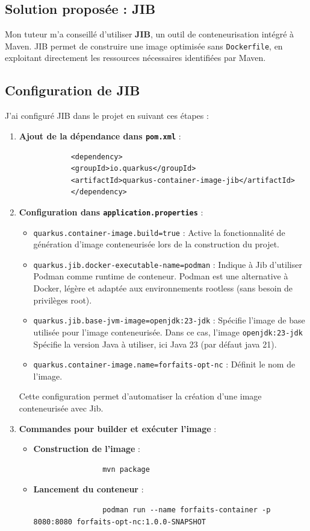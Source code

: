 \documentclass{article}
\begin{document}
	\subsection*{Solution proposée : JIB}
	
	Mon tuteur m'a conseillé d'utiliser \textbf{JIB}, un outil de conteneurisation intégré à Maven. JIB permet de construire une image optimisée sans \texttt{Dockerfile}, en exploitant directement les ressources nécessaires identifiées par Maven.
	
	\subsection{Configuration de JIB}
	
	J'ai configuré JIB dans le projet en suivant ces étapes :
	\begin{enumerate}
		\item \textbf{Ajout de la dépendance dans \texttt{pom.xml}} :
		\begin{lstlisting}
			<dependency>
			<groupId>io.quarkus</groupId>
			<artifactId>quarkus-container-image-jib</artifactId>
			</dependency>
		\end{lstlisting}
		
		\item \textbf{Configuration dans \texttt{application.properties}} :	
		
		\begin{itemize}
			\item \texttt{quarkus.container-image.build=true} : Active la fonctionnalité de génération d'image conteneurisée lors de la construction du projet.
			\item \texttt{quarkus.jib.docker-executable-name=podman} : Indique à Jib d'utiliser Podman comme runtime de conteneur. Podman est une alternative à Docker, légère et adaptée aux environnements rootless (sans besoin de privilèges root).
			\item \texttt{quarkus.jib.base-jvm-image=openjdk:23-jdk} : Spécifie l'image de base utilisée pour l'image conteneurisée. Dans ce cas, l'image \texttt{openjdk:23-jdk} Spécifie la version Java à utiliser, ici Java 23 (par défaut java 21).
			\item \texttt{quarkus.container-image.name=forfaits-opt-nc} : Définit le nom de l'image.
		\end{itemize}

		Cette configuration permet d'automatiser la création d'une image conteneurisée avec Jib.
		\item \textbf{Commandes pour builder et exécuter l'image} :
		\begin{itemize}
			\item \textbf{Construction de l'image} :
			\begin{verbatim}
				mvn package
			\end{verbatim}
			\item \textbf{Lancement du conteneur} :
			\begin{verbatim}
				podman run --name forfaits-container -p 8080:8080 forfaits-opt-nc:1.0.0-SNAPSHOT
			\end{verbatim}
		\end{itemize}
	\end{enumerate}
\end{document}
